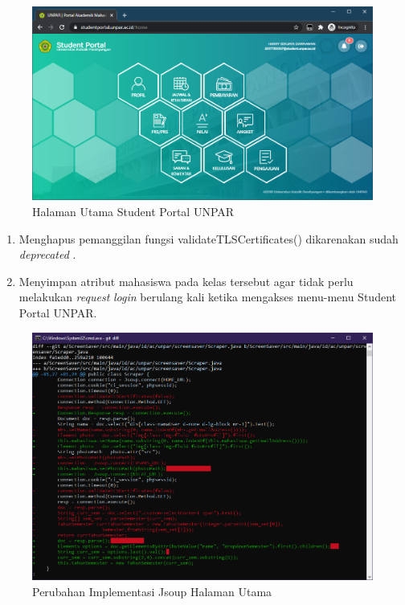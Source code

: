 \begin{figure}[H]
	\centering
	\includegraphics[scale=0.5]{Gambar/home.png}
	\caption{Halaman Utama Student Portal UNPAR} 
	\label{fig:3_home}
\end{figure}

\begin{enumerate}
    \item Menghapus pemanggilan fungsi validateTLSCertificates() dikarenakan sudah \textit{deprecated} \cite{jsoup}.
    \item Menyimpan atribut mahasiswa pada kelas tersebut agar tidak perlu melakukan \textit{request} \textit{login} berulang kali ketika mengakses menu-menu Student Portal UNPAR.
\end{enumerate}

\begin{figure}[H]
	\centering
	\includegraphics[scale=0.6]{Gambar/diff_requestNamePhotoTahunSemester.png}
	\caption{Perubahan Implementasi Jsoup Halaman Utama} 
	\label{fig:3_diff_halaman_utama}
\end{figure}

